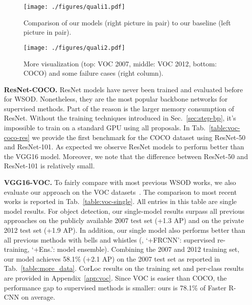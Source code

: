 \documentclass[10pt,twocolumn,letterpaper]{article}
\begin{document}
\begin{figure*}[h]
\vspace{-1em}
\centering
\texttt{[image: ./figures/quali1.pdf]}
\vspace{-0.93em}
\caption{Comparison of our models (right picture in pair) to our  baseline (left picture in pair).}
\label{fig:quali1}
\vspace{0.2em}
\texttt{[image: ./figures/quali2.pdf]}
\vspace{-0.93em}
\caption{More visualization (top: VOC 2007, middle: VOC 2012, bottom: COCO) and some failure cases (right column).}
\label{fig:quali2}
\vspace{-1.0em}
\end{figure*}


\noindent\textbf{ResNet-COCO.} ResNet models have never been trained and evaluated before for WSOD. Nonetheless, they are the most popular backbone networks for supervised methods. Part of the reason is the larger memory consumption of ResNet. Without the training techniques introduced in Sec.~\ref{sec:step-bp}, it's impossible to train  on a standard GPU using all proposals. In Tab.~\ref{table:voc-coco-res} we provide the first benchmark for the COCO dataset using ResNet-50 and ResNet-101. As expected we observe ResNet models to perform better than the VGG16 model. Moreover, we note that the difference between ResNet-50 and ResNet-101 is relatively small. 

\noindent\textbf{VGG16-VOC.}
To fairly compare with most previous WSOD works, we also evaluate our approach on the VOC datasets~\cite{pascal}. The comparison to  most recent works is reported in Tab.~\ref{table:voc-single}. All entries in this table are single model results. For object detection, our single-model results surpass all previous approaches on the publicly available 2007 test set (+1.3 AP) and on the private 2012 test set (+1.9 AP). In addition, our single model also performs better than all  previous methods with bells and whistles (\eg, `+FRCNN': supervised re-training, `+Ens.': model ensemble). Combining the 2007 and 2012  training set, our model  achieves 58.1\% (+2.1 AP) on the 2007 test set as reported in Tab.~\ref{table:more_data}. CorLoc results on the training set and  per-class results are provided in Appendix~\ref{app:voc}. Since VOC is  easier than COCO, the  performance gap to supervised methods is smaller: ours is 78.1\% of Faster R-CNN on average. 
\end{document}
